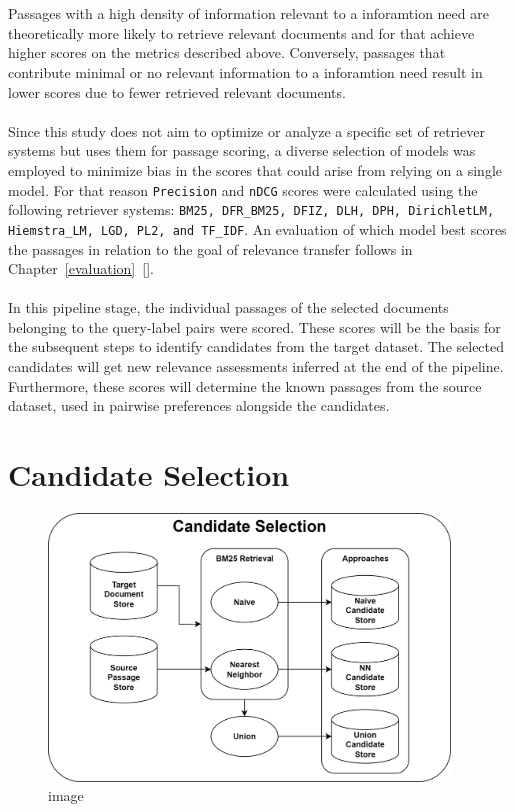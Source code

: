 \\\\
Passages with a high density of information relevant to a inforamtion need are theoretically more likely to retrieve relevant documents and  for that achieve higher scores on the metrics described above. Conversely, passages that contribute minimal or no relevant information to a inforamtion need result in lower scores due to fewer retrieved relevant documents.
\\\\
Since this study does not aim to optimize or analyze a specific set of retriever systems but uses them for passage scoring, a diverse selection of models was employed to minimize bias in the scores that could arise from relying on a single model. For that reason \texttt{Precision} and \texttt{nDCG} scores were calculated using the following retriever systems: \texttt{BM25, DFR\_BM25, DFIZ, DLH, DPH, DirichletLM, Hiemstra\_LM, LGD, PL2, and TF\_IDF}. An evaluation of which model best scores the passages in relation to the goal of relevance transfer follows in Chapter~\ref{evaluation}~[].
\\\\
In this pipeline stage, the individual passages of the selected documents belonging to the query-label pairs were scored. These scores will be the basis for the subsequent steps to identify candidates from the target dataset. The selected candidates will get new relevance assessments inferred at the end of the pipeline. Furthermore, these scores will determine the known passages from the source dataset, used in pairwise preferences alongside the candidates.


\section{Candidate Selection}\label{candidate-selection}

\begin{figure}[ht]
    \centering
    \includegraphics[width=0.95\textwidth]{./graphics/drawio/candidate_selection.png}
    \caption{image}
\end{figure}

